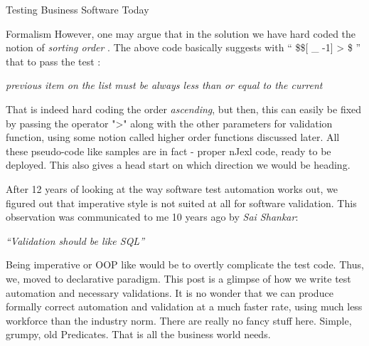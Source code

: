 \begin{section}{Testing Business Software Today}
\begin{subsection}{Formalism}
However, one may argue that in the solution we have hard coded the notion of \emph{sorting order} . The above code  basically suggests with 
`` \$\$[ \_ -1]  > \$ ''  that to pass the test :

\begin{center}
\emph{ previous item on the list must be always less than or equal to the current }
\end{center}

That is indeed hard coding the order \emph{ascending},  but then, this can easily be fixed by passing the operator 
">" along with the other parameters for validation function, using some notion called higher order functions discussed later. 
All these pseudo-code like samples are in fact - proper nJexl code, ready to be deployed. This also gives a head start on which direction we would be heading.
\end{subsection}

After 12 years of looking at the way  software test automation works out, we figured out that imperative style is not suited at all for software validation. This observation was communicated to me 10 years ago by \emph{Sai Shankar}:

\begin{center}
\emph{``Validation should be like SQL''}
\end{center}

Being imperative or OOP like would be to overtly  complicate the test code. Thus, we, moved to declarative paradigm. This post is a glimpse of how we write test automation and necessary validations. It is no wonder that we can produce formally correct automation and validation at a much faster rate, using much less workforce than the industry norm. There are really no fancy stuff here. Simple, grumpy, old Predicates. That is all the business world needs. 
\end{section}


